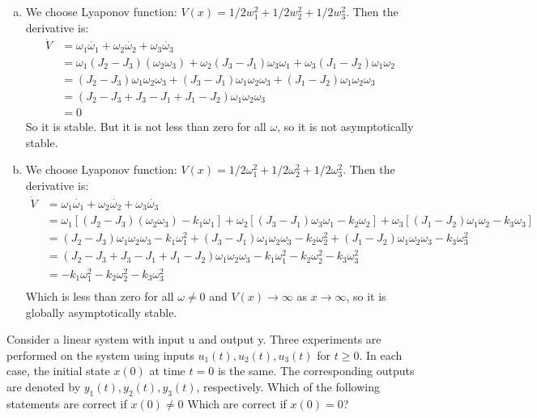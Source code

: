 \documentclass[11pt]{article}
\begin{document}
\begin{enumerate}[(a)]
    \item We choose Lyaponov function: $V(x) = 1/2 w_1^2 + 1/2 w_2^2 + 1/2 w_3^2$.
    Then the derivative is:
    \begin{align*}
        \dot{V} &= \omega_1 \dot{\omega_1} + \omega_2 \dot{\omega_2} + \omega_3 \dot{\omega_3}\\
        &= \omega_1 (J_2 - J_3)(\omega_2\omega_3) + \omega_2 (J_3 - J_1)\omega_3\omega_1 + \omega_3 (J_1 - J_2)\omega_1\omega_2\\
        &= (J_2 - J_3)\omega_1\omega_2\omega_3 + (J_3 - J_1)\omega_1\omega_2\omega_3 + (J_1 - J_2)\omega_1\omega_2\omega_3\\
        &= (J_2 - J_3 + J_3 - J_1 + J_1 - J_2)\omega_1\omega_2\omega_3\\
        &= 0
    \end{align*}
    So it is stable.
    But it is not less than zero for all $\omega$, so it is not asymptotically stable.

    \item We choose Lyaponov function: $V(x) = 1/2 \omega_1^2 + 1/2 \omega_2^2 + 1/2 \omega_3^2$.
    Then the derivative is:
    \begin{align*}
        \dot{V} &= \omega_1 \dot{\omega_1} + \omega_2 \dot{\omega_2} + \omega_3 \dot{\omega_3}\\
        &= \omega_1 [(J_2 - J_3)(\omega_2\omega_3) - k_1\omega_1] + \omega_2 [(J_3 - J_1)\omega_3\omega_1 - k_2\omega_2] + \omega_3 [(J_1 - J_2)\omega_1\omega_2 - k_3\omega_3]\\
        &= (J_2 - J_3)\omega_1\omega_2\omega_3 - k_1\omega_1^2 + (J_3 - J_1)\omega_1\omega_2\omega_3 - k_2\omega_2^2 + (J_1 - J_2)\omega_1\omega_2\omega_3 - k_3\omega_3^2\\
        &= (J_2 - J_3 + J_3 - J_1 + J_1 - J_2)\omega_1\omega_2\omega_3 - k_1\omega_1^2 - k_2\omega_2^2 - k_3\omega_3^2\\
        &= -k_1\omega_1^2 - k_2\omega_2^2 - k_3\omega_3^2\\
    \end{align*}
    Which is less than zero for all $\omega \neq 0$ and $V(x) \to \infty$ as $x \to \infty$, so it is globally asymptotically stable.
    

\end{enumerate}


Consider a linear system with input u and output y. Three experiments are
performed on the system using inputs $u_1(t), u_2(t), u_3(t)$ for $t \geq 0$. In each case, the initial
state $x(0)$ at time $t = 0$ is the same. The corresponding outputs are denoted by $y_1(t), y_2(t)
, y_3(t)$, respectively. Which of the following statements are correct if $x(0) \neq 0$ Which
are correct if $x(0) = 0$?
\end{document}
